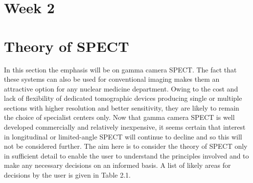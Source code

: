 \documentclass[12pt]{article}
\begin{document}
\section*{Week 2}
\section*{ Theory of SPECT}
In this section the emphasis will be on gamma camera SPECT. The fact that these systems can also be used for conventional imaging makes them an attractive option for any nuclear medicine department. Owing to the cost and lack of flexibility of dedicated tomographic devices producing single or multiple sections with higher resolution and better sensitivity, they are likely to remain the choice of specialist centers only. Now that gamma camera SPECT is well developed commercially and relatively inexpensive, it seems certain that interest in longitudinal or limited-angle SPECT will continue to decline and so this will not be considered further. The aim here is to consider the theory of SPECT
only in sufficient detail to enable the user to understand the principles involved and to make any necessary decisions on an informed basis. A list of likely areas for decisions by the user is given in Table 2.1.
\end{document}
